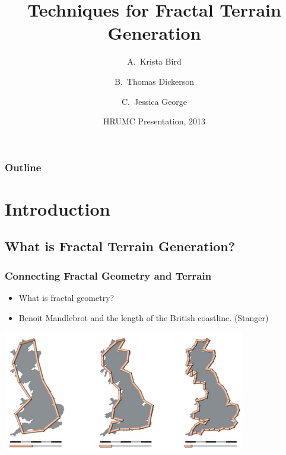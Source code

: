 \documentclass{beamer}
\title[Techniques for Fractal Terrain Generation] %
{Techniques for Fractal Terrain Generation}
\author[K. Bird, T. Dickerson, J. George] 
{A.~Krista Bird \and B.~Thomas Dickerson \and C.~Jessica George}
\date[HRUMC] %
{HRUMC Presentation, 2013}
\begin{document}
\begin{frame}
  \titlepage
\end{frame}

\begin{frame}
  \frametitle{Outline}
  \tableofcontents
\end{frame}





\section{Introduction}
\subsection{What is Fractal Terrain Generation?}

\begin{frame}
  \frametitle{Connecting Fractal Geometry and Terrain}
  \begin{itemize}
  \item What is fractal geometry?
  \item Benoit Mandlebrot and the length of the British coastline. (Stanger)
  \end{itemize}
  \begin{center}
  \includegraphics[scale=0.5]{BritainCoastline.png}
  \end{center}
\end{frame}
\end{document}
